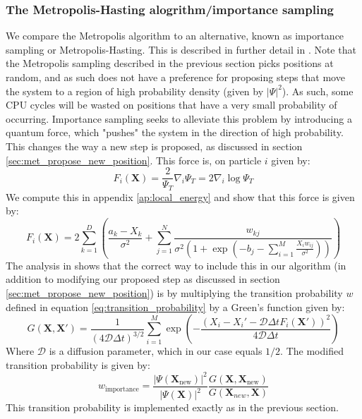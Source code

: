 \documentclass[a4paper, 10pt]{article}
\begin{document}
	\subsubsection{The Metropolis-Hasting alogrithm/importance sampling}
	We compare the Metropolis algorithm to an alternative, known as importance sampling or Metropolis-Hasting. This is described in further detail in \cite{Hjorth-Jensen2015}. Note that the Metropolis sampling described in the previous section picks positions at random, and as such does not have a preference for proposing steps that move the system to a region of high probability density (given by $|\Psi|^2$). As such, some CPU cycles will be wasted on positions that have a very small probability of occurring. Importance sampling seeks to alleviate this problem by introducing a quantum force, which "pushes" the system in the direction of high probability. This changes the way a new step is proposed, as discussed in section \ref{sec:met_propose_new_position}. This force is, on particle $i$ given by:
	\begin{equation}
	F_i(\boldsymbol{X})=\frac{2}{\Psi_T}\nabla_i \Psi_T=2\nabla_i \log \Psi_T
	\end{equation}
	We compute this in appendix \ref{ap:local_energy} and show that this force is given by:
	\begin{equation}\label{eq:quantum_force}
	F_i(\boldsymbol{X})=2\sum_{k=1}^D \left(\frac{a_k-X_k}{\sigma^2}+\sum_{j=1}^N \frac{w_{kj}}{\sigma^2 \left(1+ \exp \left(-b_j-\sum_{i=1}^{M} \frac{X_iw_{ij}}{\sigma^2}\right)\right)}\right)
	\end{equation}
	The analysis in \cite{Hjorth-Jensen2015} shows that the correct way to include this in our algorithm (in addition to modifying our proposed step as discussed in section \ref{sec:met_propose_new_position}) is by multiplying the transition probability $w$ defined in equation \ref{eq:transition_probability} by a Green's function given by:
	\begin{equation}
	G(\mathbf{X}, \mathbf{X}')=\frac{1}{(4\mathcal{D}\Delta t)^{3/2}}\sum_{i=1}^M \exp \left(-\frac{(X_i-X_i'-\mathcal{D}\Delta t F_i(\mathbf{X}'))^2}{4\mathcal{D}\Delta t}\right)
	\end{equation}
	Where $\mathcal{D}$ is a diffusion parameter, which in our case equals $1/2$. The modified transition probability is given by:
	\begin{equation}
	w_{\mathrm{importance}}=\frac{|\Psi(\boldsymbol{X}_{\mathrm{new}})|^2}{|\Psi(\boldsymbol{X})|^2}\frac{G(\boldsymbol{X}, \boldsymbol{X}_{\mathrm{new}})}{G(\boldsymbol{X}_{new}, \boldsymbol{X})}
	\end{equation}
	This transition probability is implemented exactly as in the previous section. 
\end{document}
